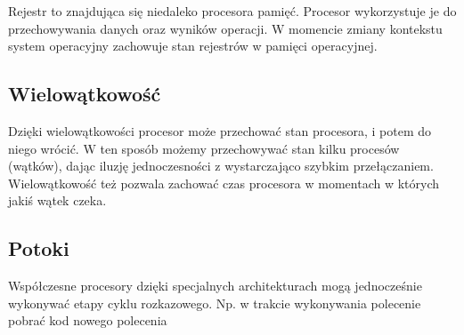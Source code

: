 \documentclass{../notatki}
\begin{document}
Rejestr to znajdująca się niedaleko procesora pamięć. Procesor wykorzystuje je
do przechowywania danych oraz wyników operacji. W momencie zmiany kontekstu
system operacyjny zachowuje stan rejestrów w pamięci operacyjnej.

\subsection{Wielowątkowość}

Dzięki wielowątkowości procesor może przechować stan procesora, i
potem do niego wrócić. W ten sposób możemy przechowywać stan kilku
procesów (wątków), dając iluzję jednoczesności z wystarczająco
szybkim przełączaniem. Wielowątkowość też pozwala zachować czas
procesora w momentach w których jakiś wątek czeka.

\subsection{Potoki}

Współczesne procesory dzięki specjalnych architekturach mogą
jednocześnie wykonywać etapy cyklu rozkazowego. Np. w trakcie
wykonywania polecenie pobrać kod nowego polecenia
\end{document}
